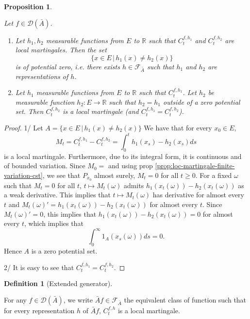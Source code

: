 \documentclass[11pt]{amsart}
\newtheorem{proposition}[theorem]{Proposition}
\theoremstyle{definition}
\newtheorem{definition}[theorem]{Definition}
\theoremstyle{remark}
\newcommand{\depends}[1]{}
\newcommand{\weakdepends}[1]{}
\newcommand{\extgen}{\bar{A}}
\newcommand{\Feqgen}{\mathcal{F}_{\extgen}}
\begin{document}
\begin{proposition}\label{prop:eq-class-ext-gen}
\depends{def:ext-gen-domain}
\weakdepends{def:potential-zero-set}
Let $f \in \mathcal{D}(\extgen)$.
\begin{enumerate}
	\item Let $h_1,h_2$ measurable functions from $E$ to $\mathbb{R}$ such that $C_t^{f,h_1}$ and $C_t^{f,h_2}$ are local martingales. Then the set 
	\[ 
	 \{x \in E \, | \,  h_1(x) \neq h_2(x) \}
	\]
	is of potential zero, i.e. there exists $h\in \Feqgen$ such that $h_1$ and $h_2$ are representations of $h$.
	\item  Let $h_1$ measurable functions from $E$ to $\mathbb{R}$ such that $C_t^{f,h_1}$. Let $h_2$ be measurable function $h_2: E \rightarrow \mathbb{R}$ such that $h_2 = h_1$ outside of a zero potential set. Then $C_t^{f,h_2}$ is a local martingale (and $C_t^{f,h_1}  = C_t^{f,h_2}$).
\end{enumerate}
\end{proposition}
\begin{proof}
1/ Let $A = \{x \in E \, | \, h_1(x) \neq h_2(x) \}$
We have that for every $x_0 \in E$,
\[
	M_t = C_t^{f,h_1} - C_t^{f,h_2} = \int_0^t h_1(x_s) - h_2(x_s) ds
\]
is a local martingale. Furthermore, due to its integral form, it is continuous and of bounded variation. Since $M_0 = $ and using prop \ref{prop:loc-martingale-finite-variation-cst}, we see that $P_{x_0}$ almost surely, $M_t = 0$ for all $t \geq 0$.
For a fixed $\omega$ such that $M_t = 0$ for all $t$, $t \mapsto M_t(\omega)$ admits $h_1(x_t(\omega)) - h_2(x_t(\omega))$ as a weak derivative. This implies that $t \mapsto M_t(\omega)$ has derivative for almost every $t$ and $M_t(\omega)' = h_1(x_t(\omega)) - h_2(x_t(\omega))$ for almost every $t$. Since $M_t(\omega)' = 0$, this implies that $h_1(x_t(\omega)) - h_2(x_t(\omega)) = 0$ for almost every $t$, which implies that
\[
	\int_0^\infty 1_A(x_s(\omega)) ds = 0.
\]
Hence $A$ is a zero potential set.

2/ It is easy to see that $C_t^{f,h_1}  = C_t^{f,h_2}$.
\end{proof}

\begin{definition}[Extended generator]\label{def:ext-gen}
\depends{prop:eq-class-ext-gen,def:potential-zero-set,def:ext-gen-domain}
For any $f \in \mathcal{D}(\extgen)$, we write $\extgen f \in \Feqgen$ the equivalent class of function such that for every representation $h$ of $\extgen f$, $C_t^{f,h}$ is a local martingale.
\end{definition}
\end{document}
